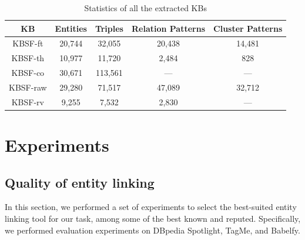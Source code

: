\begin{table}[ht!]
\scriptsize
\centering
	\begin{tabular}{  c c c c c }
	\hline
	\textbf{KB} & \textbf{Entities} & \textbf{Triples} & \textbf{Relation Patterns} & \textbf{Cluster Patterns} \\
	\hline
	\textsc{KBSF}-ft & 20,744 & 32,055 & 20,438 & 14,481 \\
	\textsc{KBSF}-th & 10,977 & 11,720 & 2,484 & 828 \\
	\hline
	\textsc{KBSF}-co & 30,671 & 113,561 & --- & --- \\
	\textsc{KBSF}-raw & 29,280 & 71,517 & 47,089 & 32,712 \\
	\hline
	\textsc{KBSF}-rv & 9,255 & 7,532 & 2,830 & --- \\
	\hline
	\end{tabular}
	\caption{Statistics of all the extracted KBs}
	\label{tab:kbs}
\end{table}


\section{Experiments}
\label{sec:kb:experiments}

\subsection{Quality of entity linking}
\label{sec:kb:experiments:qualityentitylinking}

In this section, we performed a set of experiments to select the best-suited entity linking tool for our task, among some of the best known and reputed. Specifically, we performed evaluation experiments on DBpedia Spotlight, TagMe, and Babelfy. 



